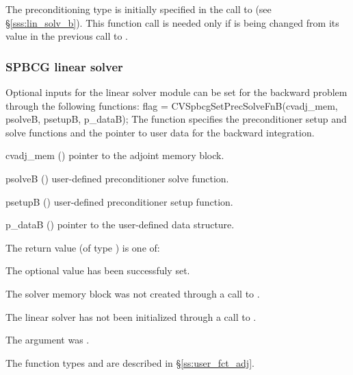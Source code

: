 {
  The preconditioning type is initially specified in the call
  to  (see \S\ref{sss:lin_solv_b}). This function call is
  needed only if  is being changed from its value in the
  previous call to .
}

\subsubsection{SPBCG linear solver}
Optional inputs for the {\cvspbcg} linear solver module can be set for the backward
problem through the following functions:
{
  flag = CVSpbcgSetPrecSolveFnB(cvadj\_mem, psolveB, psetupB, p\_dataB);
}
{
  The function  specifies the preconditioner
  setup and solve functions and the pointer to user data for the backward integration.
}
{
  \begin{args}
  \item[cvadj\_mem] ()
    pointer to the adjoint memory block.
  \item[psolveB] ()
    user-defined preconditioner solve function.
  \item[psetupB] ()
    user-defined preconditioner setup function.
  \item[p\_dataB] ()
     pointer to the user-defined data structure.
  \end{args}
}
{
  The return value  (of type ) is one of:
  \begin{args}
  \item[\Id{CVSPGMR\_SUCCESS}] 
    The optional value has been successfuly set.
  \item[\Id{CVSPGMR\_MEM\_NULL}]
    The {\cvodes} solver memory block was not created through a call to .
  \item[\Id{CVSPGMR\_LMEM\_NULL}]
    The {\cvspbcg} linear solver has not been initialized through a call to .
  \item[\Id{CVSPGMR\_ADJMEM\_NULL}]
    The  argument was .
  \end{args}
}
{
   The function types  and  are
   described in \S\ref{ss:user_fct_adj}.
}
